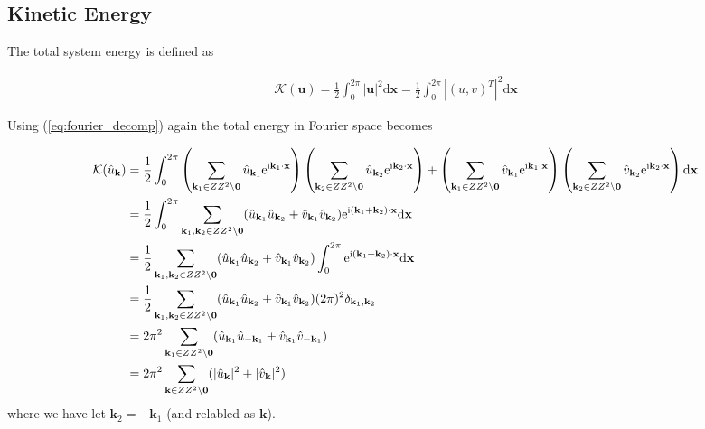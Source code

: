 \documentclass[9pt]{article}
\newcommand{\ii}{\mathrm{i}}      								  %
\newcommand{\e}{\mathrm{e}}      								  %
\newcommand{\bfu}{\mathbf{u}}											%
\newcommand{\bfx}{\mathbf{x}}								%
\newcommand{\bfk}{\mathbf{k}}								%
\newcommand{\bfkn}[1]{\mathbf{k}_{#1}}								%
\begin{document}
\subsection{Kinetic Energy}

The total system energy is defined as

\begin{align}
	\mathcal{K}(\bfu) = \frac{1}{2}\int_0^{2 \pi}|\bfu|^2\mathrm{d}\bfx = \frac{1}{2}\int_0^{2\pi} |(u, v)^{T}|^2 \mathrm{d}\bfx 
\end{align}

Using (\ref{eq:fourier_decomp}) again the total energy in Fourier space becomes

\begin{align}
\mathcal{K}(\hat{u}_{\bfk})	&= \frac{1}{2}\int_0^{2\pi} \left(\sum_{\mathbf{k}_1\in \mathbb{Z}^2\setminus \mathbf{0}}\hat{u}_{\mathbf{k}_1}\e^{\ii \mathbf{k}_1\cdot \mathbf{x}}\right)\left(\sum_{\mathbf{k}_2\in \mathbb{Z}^2\setminus \mathbf{0}}\hat{u}_{\mathbf{k}_2}\e^{\ii \mathbf{k}_2\cdot \mathbf{x}}\right) + \left(\sum_{\mathbf{k}_1\in \mathbb{Z}^2\setminus \mathbf{0}}\hat{v}_{\mathbf{k}_1}\e^{\ii \mathbf{k}_1\cdot \mathbf{x}}\right)\left(\sum_{\mathbf{k}_2\in \mathbb{Z}^2\setminus \mathbf{0}}\hat{v}_{\mathbf{k}_2}\e^{\ii \mathbf{k}_2\cdot \mathbf{x}}\right) \mathrm{d}\bfx \notag\\
	&= \frac{1}{2}\int_0^{2\pi} \sum_{\mathbf{k}_1, \mathbf{k}_2\in \mathbb{Z}^2\setminus \mathbf{0}} (\hat{u}_{\mathbf{k}_1}\hat{u}_{\mathbf{k}_2} + \hat{v}_{\mathbf{k}_1}\hat{v}_{\mathbf{k}_2}) \e^{\ii (\mathbf{k}_1 + \mathbf{k}_2)\cdot \mathbf{x}} \mathrm{d}\bfx \notag \\
	&= \frac{1}{2}\sum_{\mathbf{k}_1, \mathbf{k}_2\in \mathbb{Z}^2\setminus \mathbf{0}} (\hat{u}_{\mathbf{k}_1}\hat{u}_{\mathbf{k}_2} + \hat{v}_{\mathbf{k}_1}\hat{v}_{\mathbf{k}_2}) \int_0^{2\pi} \e^{\ii (\mathbf{k}_1 + \mathbf{k}_2)\cdot \mathbf{x}} \mathrm{d}\bfx \notag \\
	&= \frac{1}{2}\sum_{\mathbf{k}_1, \mathbf{k}_2\in \mathbb{Z}^2\setminus \mathbf{0}} (\hat{u}_{\mathbf{k}_1}\hat{u}_{\mathbf{k}_2} + \hat{v}_{\mathbf{k}_1}\hat{v}_{\mathbf{k}_2}) (2\pi)^2 \delta_{\bfkn{1}, \bfkn{2}} \notag \\
	&= 2\pi^2 \sum_{\mathbf{k}_1\in \mathbb{Z}^2\setminus \mathbf{0}} (\hat{u}_{\mathbf{k}_1}\hat{u}_{-\mathbf{k}_1} + \hat{v}_{\mathbf{k}_1}\hat{v}_{-\mathbf{k}_{1}}) \notag \\
	&= 2\pi^2 \sum_{\mathbf{k}\in \mathbb{Z}^2\setminus \mathbf{0}} (|\hat{u}_{\mathbf{k}}|^2 + |\hat{v}_{\mathbf{k}}|^2)
	\label{eq:energy_u_fourier}
\end{align}
where we have let $\bfkn{2} = - \bfkn{1}$ (and relabled as $\bfk$).
\end{document}
